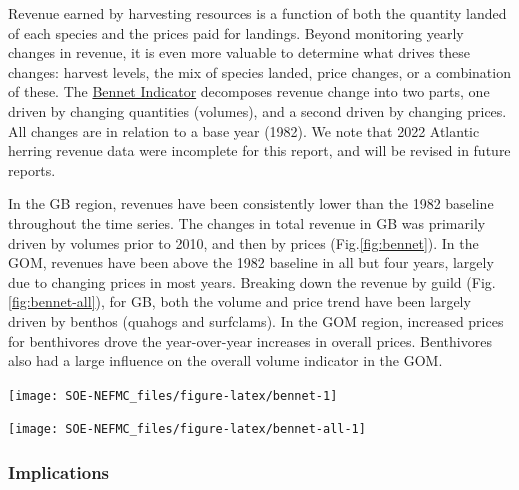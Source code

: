 \documentclass[
  10pt,
]{article}
\let\origfigure\figure
\let\endorigfigure\endfigure
\renewenvironment{figure}[1][2] {
    \expandafter\origfigure\expandafter[H]
} {
    \endorigfigure
}
\begin{document}
Revenue earned by harvesting resources is a function of both the quantity landed of each species and the prices paid for landings. Beyond monitoring yearly changes in revenue, it is even more valuable to determine what drives these changes: harvest levels, the mix of species landed, price changes, or a combination of these. The \href{https://noaa-edab.github.io/catalog/bennet.html}{Bennet Indicator} decomposes revenue change into two parts, one driven by changing quantities (volumes), and a second driven by changing prices. All changes are in relation to a base year (1982). We note that 2022 Atlantic herring revenue data were incomplete for this report, and will be revised in future reports.

In the GB region, revenues have been consistently lower than the 1982 baseline throughout the time series. The changes in total revenue in GB was primarily driven by volumes prior to 2010, and then by prices (Fig.\ref{fig:bennet}). In the GOM, revenues have been above the 1982 baseline in all but four years, largely due to changing prices in most years. Breaking down the revenue by guild (Fig. \ref{fig:bennet-all}), for GB, both the volume and price trend have been largely driven by benthos (quahogs and surfclams). In the GOM region, increased prices for benthivores drove the year-over-year increases in overall prices. Benthivores also had a large influence on the overall volume indicator in the GOM.

\begin{figure}

{\centering \texttt{[image: SOE-NEFMC\_files/figure-latex/bennet-1]} 

}

\caption{Revenue change from the 1982 baseline in 2022 dollars (black), price, and volume for commercial landings from Georges Bank (GB: left) and the Gulf of Maine (GOM: right)}\label{fig:bennet}
\end{figure}
\begin{figure}

{\centering \texttt{[image: SOE-NEFMC\_files/figure-latex/bennet-all-1]} 

}

\caption{Revenue change from the long-term mean in 2022 dollars (black), price, and volume for commercial landings from Georges Bank (GB: top panels) and the Gulf of Maine (GOM: bottom panels)}\label{fig:bennet-all}
\end{figure}

\hypertarget{implications-1}{%
\subsubsection{Implications}\label{implications-1}}
\end{document}
